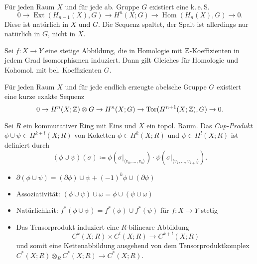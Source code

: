 \documentclass{cheat-sheet}
\newcommand{\angles}[1]{{\langle #1 \rangle}}
\DeclareMathOperator{\Hom}{Hom} %
\DeclareMathOperator{\Tor}{Tor}
\DeclareMathOperator{\Ext}{Ext}
\newcommand{\keS}{k.\,e.\,S.} %
\begin{document}
\begin{satz}\mbox{}\\
  Für jeden Raum $X$ und für jede ab. Gruppe $G$ existiert eine \keS{}
  \[ 0 \to \Ext(H_{n-1}(X), G) \to H^n(X; G) \to \Hom(H_n(X), G) \to 0. \]
  Diese ist natürlich in $X$ und $G$. Die Sequenz spaltet, der Spalt ist allerdings nur natürlich in $G$, nicht in $X$.
\end{satz}

\begin{kor}
  Sei $f : X \to Y$ eine stetige Abbildung, die in Homologie mit $\mathbb{Z}$-Koeffizienten in jedem Grad Isomorphismen induziert. Dann gilt Gleiches für Homologie und Kohomol. mit bel. Koeffizienten $G$.
\end{kor}

\begin{satz}
  Für jeden Raum $X$ und für jede endlich erzeugte abelsche Gruppe $G$ existiert eine kurze exakte Sequenz
  \[ 0 \to H^n(X; \Z) \otimes G \to H^n(X; G) \to \Tor(H^{n+1}(X; \Z), G) \to 0. \]
\end{satz}



\begin{defn}
  Sei $R$ ein kommutativer Ring mit Eins und $X$ ein topol. Raum. Das \emph{Cup-Produkt} $\phi \cup \psi \in H^{k+l}(X; R)$ von Koketten $\phi \in H^k(X; R)$ und $\psi \in H^l(X; R)$ ist definiert durch
  \[ (\phi \cup \psi)(\sigma) \coloneqq \phi(\sigma|_\angles{v_0, \ldots, v_k}) \cdot \psi(\sigma|_\angles{v_k, \ldots, v_{k+l}}). \]
\end{defn}

\begin{lem}
  \begin{itemize}
    \item $\partial (\phi \cup \psi) = (\partial \phi) \cup \psi + (-1)^k \phi \cup (\partial \psi)$
    \item Assoziativität: $(\phi \cup \psi) \cup \omega = \phi \cup (\psi \cup \omega)$
    \item Natürlichkeit: $f^*(\phi \cup \psi) = f^*(\phi) \cup f^*(\psi)$ für $f : X \to Y$ stetig
    \item Das Tensorprodukt induziert eine $R$-bilineare Abbildung
    \[ C^k(X; R) \times C^l(X; R) \to C^{k+l}(X; R) \]
    und somit eine Kettenabbildung ausgehend von dem Tensorproduktkomplex
    $C^*(X; R) \otimes_R C^*(X; R) \to C^*(X; R)$.
  \end{itemize}
\end{lem}
\end{document}

